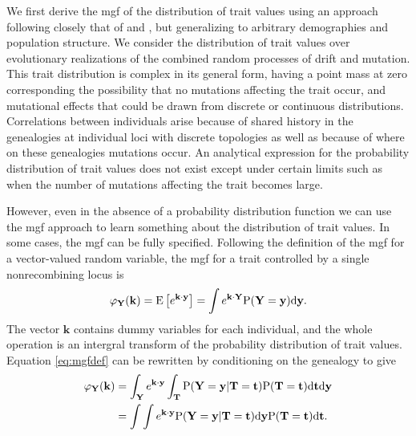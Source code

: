 We first derive the mgf of the distribution of trait values using an approach
following closely that of \citet{Schraiber2015} and \citet{Khaitovich2005}, but
generalizing to arbitrary demographies and population structure. We consider the
distribution of trait values over evolutionary realizations of the combined
random processes of drift and mutation. This trait distribution is complex in
its general form, having a point mass at zero corresponding the possibility that
no mutations affecting the trait occur, and mutational effects that could be
drawn from discrete or continuous distributions. Correlations between
individuals arise because of shared history in the genealogies at individual
loci with discrete topologies as well as because of where on these genealogies
mutations occur. An analytical expression for the probability distribution of
trait values does not exist except under certain limits such as when the number
of mutations affecting the trait becomes large.

However, even in the absence of a probability distribution function we can use
the mgf approach to learn something about the distribution of trait values. In
some cases, the mgf can be fully specified. Following the definition of the mgf
for a vector-valued random variable, the mgf for a trait controlled by a single
nonrecombining locus is
\begin{equation}
  \label{eq:mgfdef}
  \varphi_{\mathbf{Y}}(\mathbf{k}) = \mathrm{E}\left[ e^{\mathbf{k} \cdot \mathbf{y}} \right] =
  \int e^{\mathbf{k} \cdot \mathbf{Y}} \mathrm{P}(\mathbf{Y}=\mathbf{y}) \mbox{d}\mathbf{y}.
\end{equation}
The vector $\mathbf{k}$ contains dummy variables for each individual, and the
whole operation is an intergral transform of the probability distribution of
trait values. Equation \eqref{eq:mgfdef} can be rewritten by conditioning on the
genealogy to give
\begin{align}
  \label{eq:cond}
  \varphi_{\mathbf{Y}}(\mathbf{k}) &= \int_{\mathbf{Y}} e^{\mathbf{k} \cdot \mathbf{y}}
  \int_{\mathbf{T}} \mathrm{P}(\mathbf{Y}=\mathbf{y} | \mathbf{T}=\mathbf{t}) \mathrm{P}(\mathbf{T}=\mathbf{t})
  \mbox{d}\mathbf{t} \mbox{d}\mathbf{y} \nonumber \\
  &= \int \int e^{\mathbf{k} \cdot \mathbf{y}} \mathrm{P}(\mathbf{Y}=\mathbf{y} | \mathbf{T}=\mathbf{t}) \mbox{d}\mathbf{y}
  \mathrm{P}(\mathbf{T}=\mathbf{t})
  \mbox{d}\mathbf{t}.
\end{align}

